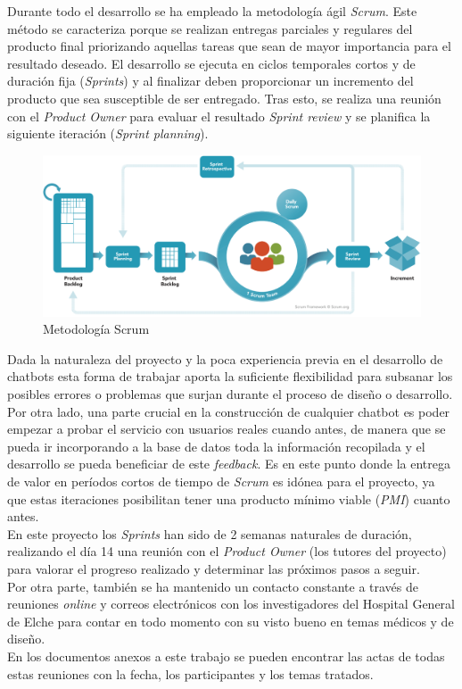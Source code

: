 Durante todo el desarrollo se ha empleado la metodología ágil \textit{Scrum}. Este método se caracteriza porque se realizan entregas parciales y regulares del producto final priorizando aquellas tareas que sean de mayor importancia para el resultado deseado. El desarrollo se ejecuta en ciclos temporales cortos y de duración fija (\textit{Sprints}) y al finalizar deben proporcionar un incremento del producto que sea susceptible de ser entregado. Tras esto, se realiza una reunión con el \textit{Product Owner} para evaluar el resultado \textit{Sprint review} y se planifica la siguiente iteración (\textit{Sprint planning}).\\

\begin{figure}[h]
\centering
\includegraphics[scale=0.5]{../images/scrum.png} 
\caption{Metodología Scrum}
\label{fig:x scrum}
\end{figure}

Dada la naturaleza del proyecto y la poca experiencia previa en el desarrollo de chatbots esta forma de trabajar aporta la suficiente flexibilidad para subsanar los posibles errores o problemas que surjan durante el proceso de diseño o desarrollo. Por otra lado, una parte crucial en la construcción de cualquier chatbot es poder empezar a probar el servicio con usuarios reales cuando antes, de manera que se pueda ir incorporando a la base de datos toda la información recopilada y el desarrollo se pueda beneficiar de este \textit{feedback}. Es en este punto donde la entrega de valor en períodos cortos de tiempo de \textit{Scrum} es idónea para el proyecto, ya que estas iteraciones posibilitan tener una producto mínimo viable (\textit{PMI}) cuanto antes.\\

En este proyecto los \textit{Sprints} han sido de 2 semanas naturales de duración, realizando el día 14 una reunión con el \textit{Product Owner} (los tutores del proyecto) para valorar el progreso realizado y determinar las próximos pasos a seguir. \\

Por otra parte, también se ha mantenido un contacto constante a través de reuniones \textit{online} y correos electrónicos con los investigadores del Hospital General de Elche para contar en todo momento con su visto bueno en temas médicos y de diseño.\\

En los documentos anexos a este trabajo se pueden encontrar las actas de todas estas reuniones con la fecha, los participantes y los temas tratados.\\



